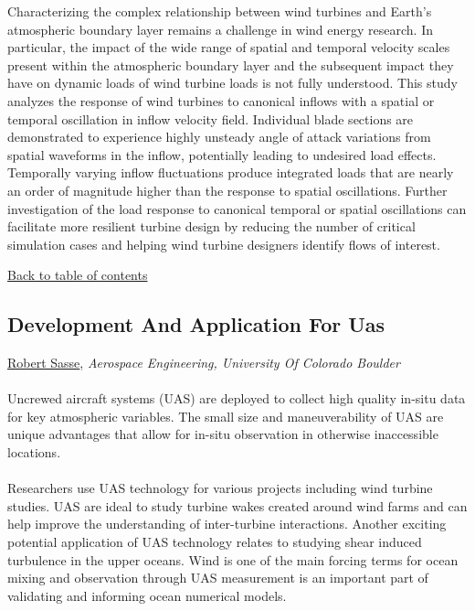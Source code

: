 \noindent Characterizing the complex relationship between wind turbines and Earth’s atmospheric boundary layer remains a challenge in wind energy research. In particular, the impact of the wide range of spatial and temporal velocity scales present within the atmospheric boundary layer and the subsequent impact they have on dynamic loads of wind turbine loads is not fully understood. This study analyzes the response of wind turbines to canonical inflows with a spatial or temporal oscillation in inflow velocity field. Individual blade sections are demonstrated to experience highly unsteady angle of attack variations from spatial waveforms in the inflow, potentially leading to undesired load effects. Temporally varying inflow fluctuations produce integrated loads that are nearly an order of magnitude higher than the response to spatial oscillations. Further investigation of the load response to canonical temporal or spatial oscillations can facilitate more resilient turbine design by reducing the number of critical simulation cases and helping wind turbine designers identify flows of interest.  \\ 
\begin{flushright}\vspace{-0.2 in}\hyperlink{toc}{Back to table of contents}\end{flushright}\vspace{-0.2 in}
\hypertarget{RobertSasse}{\subsection*{\color{CUGOLD} Development And Application For Uas}} \vsp 
\underline{Robert Sasse}, \textit{Aerospace Engineering, University Of Colorado Boulder}\\ 
\vspace{-0.1 in} \\ 
\noindent Uncrewed aircraft systems (UAS) are deployed to collect high quality in-situ data for key atmospheric variables. The small size and maneuverability of UAS are unique advantages that allow for in-situ observation in otherwise inaccessible locations.  \\ 
\noindent  \\ 
\noindent Researchers use UAS technology for various projects including wind turbine studies. UAS are ideal to study turbine wakes created around wind farms and can help improve the understanding of inter-turbine interactions. Another exciting potential application of UAS technology relates to studying shear induced turbulence in the upper oceans. Wind is one of the main forcing terms for ocean mixing and observation through UAS measurement is an important part of validating and informing ocean numerical models.     \\ 
